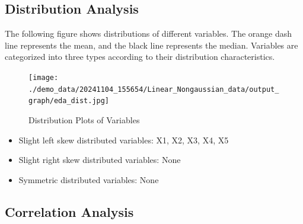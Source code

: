 \documentclass{article}
\begin{document}
\subsection{Distribution Analysis}
The following figure shows distributions of different variables. The orange dash line represents the mean, 
and the black line represents the median. Variables are categorized into three types according to their distribution characteristics.

\begin{figure}[H]
\centering
\texttt{[image: ./demo\_data/20241104\_155654/Linear\_Nongaussian\_data/output\_graph/eda\_dist.jpg]}
\caption{\label{fig:dist}Distribution Plots of Variables}
\end{figure}

\begin{itemize}
\item Slight left skew distributed variables: X1, X2, X3, X4, X5
\item Slight right skew distributed variables: None
\item Symmetric distributed variables: None
\end{itemize}

\subsection{Correlation Analysis}
\end{document}
